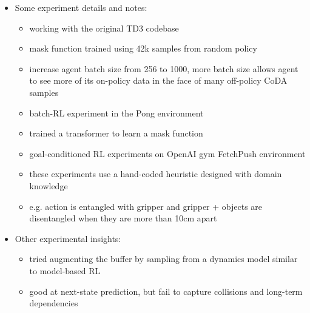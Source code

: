 \begin{itemize}
\begin{itemize}
  \end{itemize}
  \item Some experiment details and notes:
  \begin{itemize}
    \item working with the original TD3 codebase
    \item mask function trained using 42k samples from random policy
    \item increase agent batch size from 256 to 1000, more batch size allows agent to see more of its on-policy data in the face of many off-policy CoDA samples
    \item batch-RL experiment in the Pong environment
    \item trained a transformer to learn a mask function
    \item goal-conditioned RL experiments on OpenAI gym FetchPush environment
    \item these experiments use a hand-coded heuristic designed with domain knowledge
    \item e.g. action is entangled with gripper and gripper + objects are disentangled when they are more than 10cm apart
  \end{itemize}
  \item Other experimental insights:
  \begin{itemize}
    \item tried augmenting the buffer by sampling from a dynamics model similar to model-based RL
    \item good at next-state prediction, but fail to capture collisions and long-term dependencies
  \end{itemize}
\end{itemize}